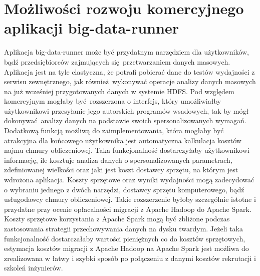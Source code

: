 \section{Możliwości rozwoju komercyjnego aplikacji big-data-runner}
Aplikacja big-data-runner może być przydatnym narzędziem dla użytkowników, bądź przedsiębiorców zajmujących się przetwarzaniem danych masowych. Aplikacja jest na tyle elastyczna, że potrafi pobierać dane do testów wydajności z serwisu zewnętrznego, jak również wykonywać operacje analizy danych masowych na już wcześniej przygotowanych danych w systemie HDFS. Pod względem komercyjnym mogłaby być rozszerzona o interfejs, który umożliwiałby użytkownikowi przesyłanie jego autorskich programów wsadowych, tak by mógł dokonywać analizy danych na podstawie swoich spersonalizowanych wymagań. Dodatkową funkcją możliwą do zaimplementowania, która mogłaby być atrakcyjna dla końcowego użytkownika jest automatyczna kalkulacja kosztów najmu chmury obliczeniowej. Taka funkcjonalność dostarczyłaby użytkownikowi informację, ile kosztuje analiza danych o spersonalizowanych parametrach, zdefiniowanej wielkości oraz jaki jest koszt dostawcy sprzętu, na którym jest wdrożona aplikacja. Koszty sprzętowe oraz wyniki wydajności mogą zadecydować o wybraniu jednego z dwóch narzędzi, dostawcy sprzętu komputerowego, bądź usługodawcy chmury obliczeniowej. Takie rozszerzenie byłoby szczególnie istotne i przydatne przy ocenie opłacalności migracji z Apache Hadoop do Apache Spark. Koszty sprzętowe korzystania z Apache Spark mogą być zbliżone podczas zastosowania strategii przechowywania danych na dysku twardym. Jeżeli taka funkcjonalność dostarczałaby wartości pieniężnych co do kosztów sprzętowych, estymacja kosztów migracji z Apache Hadoop na Apache Spark jest możliwa do zrealizowana w łatwy i szybki sposób po połączeniu z danymi kosztów rekrutacji i szkoleń inżynierów. 